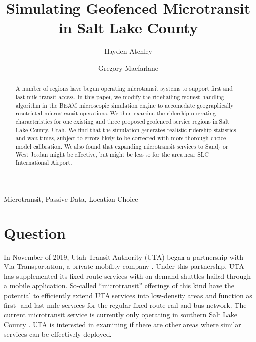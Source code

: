 \documentclass[3p, authoryear]{elsarticle} %
\begin{document}
\begin{frontmatter}

  \title{Simulating Geofenced Microtransit in Salt Lake County}
    \author[Brigham Young University]{Hayden Atchley}
    \author[Brigham Young University]{Gregory Macfarlane}
      \address[Brigham Young University]{Civil and Construction Engineering Department, 430 Engineering Building, Provo, Utah 84602}
    
  \begin{abstract}
  A number of regions have begun operating microtransit systems to support first and last mile transit access. In this paper, we modify the ridehailing request handling algorithm in the BEAM microscopic simulation engine to accomodate geographically resetricted microstransit operations. We then examine the ridership operating characteristics for one existing and three proposed geofenced service regions in Salt Lake County, Utah. We find that the simulation generates realistic ridership statistics and wait times, subject to errors likely to be corrected with more thorough choice model calibration. We also found that expanding microtransit services to Sandy or West Jordan might be effective, but might be less so for the area near SLC International Airport.
  \end{abstract}
   \begin{keyword} Microtransit, Passive Data, Location Choice\end{keyword}
 \end{frontmatter}

\hypertarget{question}{%
\section{Question}\label{question}}

In November of 2019, Utah Transit Authority (UTA) began a partnership with Via Transportation, a private mobility company \citep{UTAreport}.
Under this partnership, UTA has supplemented its fixed-route services with on-demand shuttles hailed through a mobile application.
So-called ``microtransit'' offerings of this kind have the potential to efficiently extend UTA services into low-density areas and function as first- and last-mile services for the regular fixed-route rail and bus network.
The current microtransit service is currently only operating in southern Salt Lake County \citep{UTAonDemand}.
UTA is interested in examining if there are other areas where similar services can be effectively deployed.
\end{document}
